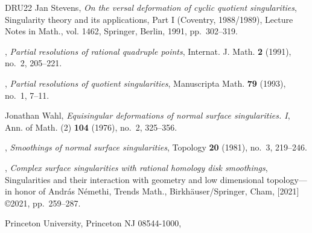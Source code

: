 \documentclass{amsart}
\theoremstyle{definition}
\theoremstyle{remark}
\begin{document}
\begin{thebibliography}{DRU22}
Jan Stevens, \emph{On the versal deformation of cyclic quotient singularities},
  Singularity theory and its applications, {P}art {I} ({C}oventry, 1988/1989),
  Lecture Notes in Math., vol. 1462, Springer, Berlin, 1991, pp.~302--319.

\bysame, \emph{Partial resolutions of rational quadruple points}, Internat. J.
  Math. \textbf{2} (1991), no.~2, 205--221. 

\bysame, \emph{Partial resolutions of quotient singularities}, Manuscripta
  Math. \textbf{79} (1993), no.~1, 7--11. 

Jonathan Wahl, \emph{Equisingular deformations of normal surface singularities.
  {I}}, Ann. of Math. (2) \textbf{104} (1976), no.~2, 325--356. 

\bysame, \emph{Smoothings of normal surface singularities}, Topology
  \textbf{20} (1981), no.~3, 219--246. 

\bysame, \emph{Complex surface singularities with rational homology disk
  smoothings}, Singularities and their interaction with geometry and low
  dimensional topology---in honor of {A}ndr\'{a}s {N}\'{e}methi, Trends Math.,
  Birkh\"{a}user/Springer, Cham, [2021] \copyright 2021, pp.~259--287.

\end{thebibliography}



 \bigskip


  Princeton University, Princeton NJ 08544-1000, \




 
\end{document}
